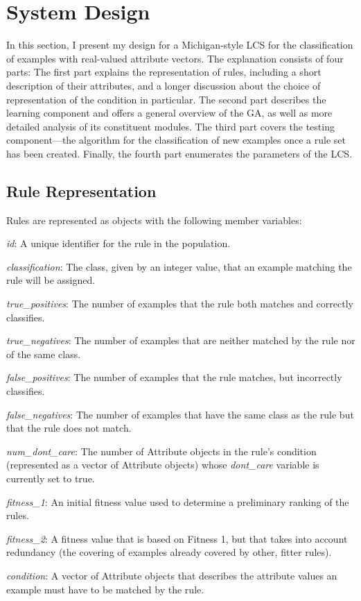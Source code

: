 \documentclass[12pt]{article}
\begin{document}
\section{System Design}

In this section, I present my design for a Michigan-style LCS for the classification of examples with real-valued attribute vectors. The explanation consists of four parts: The first part explains the representation of rules, including a short description of their attributes, and a longer discussion about the choice of representation of the condition in particular. The second part describes the learning component and offers a general overview of the GA, as well as more detailed analysis of its constituent modules. The third part covers the testing component---the algorithm for the classification of new examples once a rule set has been created. Finally, the fourth part enumerates the parameters of the LCS.

\subsection{Rule Representation}

Rules are represented as objects with the following member variables:

\begin{description}
\item \textit{id}: A unique identifier for the rule in the population.
\item \textit{classification}: The class, given by an integer value, that an example matching the rule will be assigned.
\item \textit{true\_positives}: The number of examples that the rule both matches and correctly classifies.
\item \textit{true\_negatives}: The number of examples that are neither matched by the rule nor of the same class.
\item \textit{false\_positives}: The number of examples that the rule matches, but incorrectly classifies.
\item \textit{false\_negatives}: The number of examples that have the same class as the rule but that the rule does not match.
\item \textit{num\_dont\_care}: The number of Attribute objects in the rule's condition (represented as a vector of Attribute objects) whose \textit{dont\_care} variable is currently set to true.
\item \textit{fitness\_1}: An initial fitness value used to determine a preliminary ranking of the rules.
\item \textit{fitness\_2}: A fitness value that is based on Fitness 1, but that takes into account redundancy (the covering of examples already covered by other, fitter rules).
\item \textit{condition}: A vector of Attribute objects that describes the attribute values an example must have to be matched by the rule.
\end{description}
\end{document}
